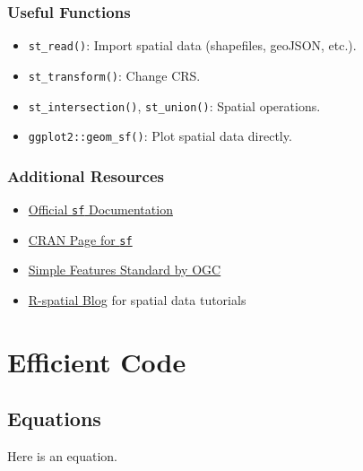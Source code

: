 \documentclass[
]{book}
\providecommand{\tightlist}{%
  \setlength{\itemsep}{0pt}\setlength{\parskip}{0pt}}
\begin{document}
\hypertarget{useful-functions}{%
\subsection{\texorpdfstring{\textbf{Useful Functions}}{Useful Functions}}\label{useful-functions}}

\begin{itemize}
\tightlist
\item
  \texttt{st\_read()}: Import spatial data (shapefiles, geoJSON, etc.).
\item
  \texttt{st\_transform()}: Change CRS.
\item
  \texttt{st\_intersection()}, \texttt{st\_union()}: Spatial operations.
\item
  \texttt{ggplot2::geom\_sf()}: Plot spatial data directly.
\end{itemize}

\hypertarget{additional-resources}{%
\subsection{\texorpdfstring{\textbf{Additional Resources}}{Additional Resources}}\label{additional-resources}}

\begin{itemize}
\tightlist
\item
  \href{https://r-spatial.github.io/sf/}{Official \texttt{sf} Documentation}\\
\item
  \href{https://cran.r-project.org/package=sf}{CRAN Page for \texttt{sf}}\\
\item
  \href{https://www.ogc.org/standards/sfa}{Simple Features Standard by OGC}\\
\item
  \href{https://r-spatial.org/}{R-spatial Blog} for spatial data tutorials
\end{itemize}

\hypertarget{efficient-code}{%
\chapter{Efficient Code}\label{efficient-code}}

\hypertarget{equations}{%
\section{Equations}\label{equations}}

Here is an equation.
\end{document}
